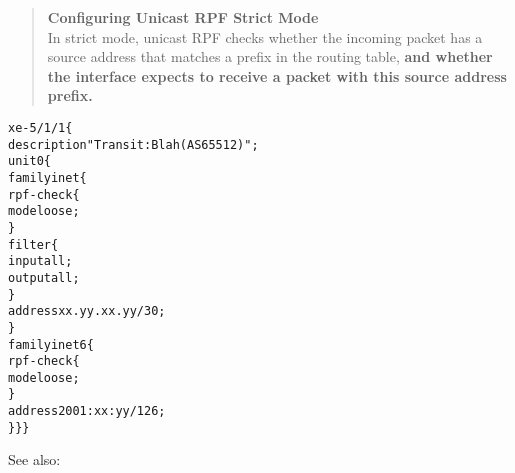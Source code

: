 \documentclass[Screen16to9,17pt]{foils}
\begin{document}
\begin{quote}
{\bf Configuring Unicast RPF Strict Mode}\\
In strict mode, unicast RPF checks whether the incoming packet has a source address that matches a prefix in the routing table, {\bf and whether the interface expects to receive a packet with this source address prefix.}
\end{quote}












\begin{alltt}\footnotesize
xe-5/1/1 \{
    description "Transit: Blah (AS65512)";
    unit 0 \{
        family inet \{
            rpf-check \{
                mode loose;
            \}
            filter \{
                input all;
                output all;
            \}
            address xx.yy.xx.yy/30;
        \}
        family inet6 \{
            rpf-check \{
                mode loose;
            \}
            address 2001:xx:yy/126;
\} \} \}
\end{alltt}

See also: {\small{}}
\end{document}
